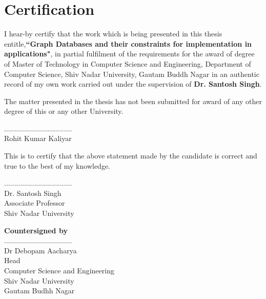 \chapter*{Certification}
I hear-by certify that the work which is being presented in this thesis entitle,\textbf{``Graph Databases and their constraints for implementation in applications"}, in partial fulfilment of the requirements for the award of degree of Master of Technology in Computer Science and Engineering, Department of Computer Science, Shiv Nadar University, Gautam Buddh Nagar in an authentic record of my own work carried out under the supervision of \textbf{Dr. Santosh Singh}.

The matter presented in the thesis has not been submitted for award of any other degree of this or any other  University.
\begin{flushright}

..................................\\
Rohit Kumar Kaliyar
\end{flushright}

                                                                                       
This is to certify that the above statement made by the candidate is correct and true to the best of my knowledge.

\begin{flushright}

..................................\\
   Dr. Santosh Singh\\
   Associate Professor\\
   Shiv Nadar University
\end{flushright}
\begin{flushright}

\textbf{Countersigned by}\\


..................................\\
Dr Debopam Aacharya\\
Head\\
Computer Science and Engineering \\
Shiv Nadar University\\
Gautam Budhh Nagar                                                                                       
                   
\end{flushright}

                                                                